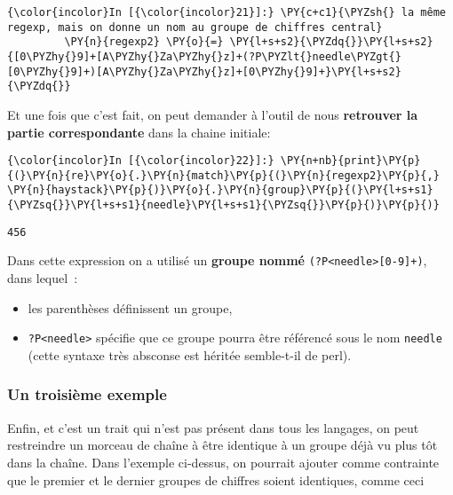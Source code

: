     \begin{Verbatim}[commandchars=\\\{\},frame=single,framerule=0.3mm,rulecolor=\color{cellframecolor}]
{\color{incolor}In [{\color{incolor}21}]:} \PY{c+c1}{\PYZsh{} la même regexp, mais on donne un nom au groupe de chiffres central}
         \PY{n}{regexp2} \PY{o}{=} \PY{l+s+s2}{\PYZdq{}}\PY{l+s+s2}{[0\PYZhy{}9]+[A\PYZhy{}Za\PYZhy{}z]+(?P\PYZlt{}needle\PYZgt{}[0\PYZhy{}9]+)[A\PYZhy{}Za\PYZhy{}z]+[0\PYZhy{}9]+}\PY{l+s+s2}{\PYZdq{}}
\end{Verbatim}


    Et une fois que c'est fait, on peut demander à l'outil de nous
\textbf{retrouver la partie correspondante} dans la chaine initiale:

    \begin{Verbatim}[commandchars=\\\{\},frame=single,framerule=0.3mm,rulecolor=\color{cellframecolor}]
{\color{incolor}In [{\color{incolor}22}]:} \PY{n+nb}{print}\PY{p}{(}\PY{n}{re}\PY{o}{.}\PY{n}{match}\PY{p}{(}\PY{n}{regexp2}\PY{p}{,} \PY{n}{haystack}\PY{p}{)}\PY{o}{.}\PY{n}{group}\PY{p}{(}\PY{l+s+s1}{\PYZsq{}}\PY{l+s+s1}{needle}\PY{l+s+s1}{\PYZsq{}}\PY{p}{)}\PY{p}{)}
\end{Verbatim}


    \begin{Verbatim}[commandchars=\\\{\},frame=single,framerule=0.3mm,rulecolor=\color{cellframecolor}]
456
\end{Verbatim}

    Dans cette expression on a utilisé un \textbf{groupe nommé}
\texttt{(?P\textless{}needle\textgreater{}{[}0-9{]}+)}, dans lequel~:

\begin{itemize}
\tightlist
\item
  les parenthèses définissent un groupe,
\item
  \texttt{?P\textless{}needle\textgreater{}} spécifie que ce groupe
  pourra être référencé sous le nom \texttt{needle} (cette syntaxe très
  absconse est héritée semble-t-il de perl).
\end{itemize}

    \hypertarget{un-troisiuxe8me-exemple}{%
\subsubsection{Un troisième exemple}\label{un-troisiuxe8me-exemple}}

    Enfin, et c'est un trait qui n'est pas présent dans tous les langages,
on peut restreindre un morceau de chaîne à être identique à un groupe
déjà vu plus tôt dans la chaîne. Dans l'exemple ci-dessus, on pourrait
ajouter comme contrainte que le premier et le dernier groupes de
chiffres soient identiques, comme ceci

